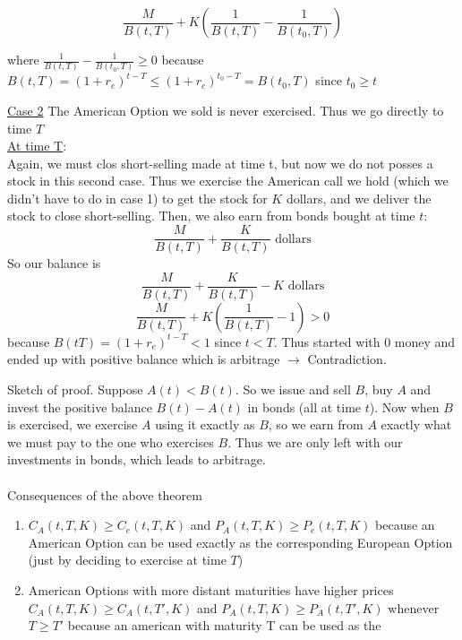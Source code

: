 \documentclass[oneside]{book}
\begin{document}
{    $$
        \frac{M}{B(t,T)} + K\left(\frac{1}{B(t,T)} - \frac{1}{B(t_0, T)}\right)

    $$

    where $\frac{1}{B(t,T)} - \frac{1}{B(t_0, T)} \geq 0$ because
        $B(t,T) = (1+r_e)^{t-T} \leq (1+r_e)^{t_0-T} = B(t_0, T)$ since $t_0 \geq t$


    \underline{Case 2} The American Option we sold is never exercised. Thus we go
    directly to time $T$ \\
    \underline{At time T}: \\
    Again, we must clos short-selling made at time t, but now we do not posses a stock in
    this second case. Thus we exercise the American call we hold (which we didn't have
    to do in case 1) to get the stock for $K$ dollars, and we deliver the stock to close
    short-selling. Then, we also earn from bonds bought at time $t$:
    $$
        \frac{M}{B(t,T)} + \frac{K}{B(t,T)} \text{ dollars}
    $$
    So our balance is
    $$
        \frac{M}{B(t,T)} + \frac{K}{B(t,T)} - K \text{ dollars}
    $$
    $$
        \frac{M}{B(t,T)} + K\left(\frac{1}{B(t,T)} - 1\right)  > 0
    $$
    because $B(t T) = (1+r_e)^{t-T} < 1$ since $t<T$. Thus started with 0 money and ended
    up with positive balance which is arbitrage $\rightarrow$ Contradiction.
}

Sketch of proof. Suppose $A(t) < B(t)$. So we issue and sell $B$, buy $A$ and invest the
positive balance $B(t) - A(t)$ in bonds (all at time $t$). Now when $B$ is exercised, we
exercise $A$ using it exactly as $B$, so we earn from $A$ exactly what we must pay to the one
who exercises $B$. Thus we are only left with our investments in bonds, which leads to
arbitrage. \\
\\
Consequences of the above theorem
\begin{enumerate}
    \item $C_A(t, T, K) \geq C_e(t, T, K)$ and $P_A(t,T,K) \geq P_e(t, T, K)$ because an
    American Option can be used exactly as the corresponding European Option (just by deciding
    to exercise at time $T$)
    \item American Options with more distant maturities have higher prices
    $C_A(t, T, K) \geq C_A(t, T', K)$ and $P_A(t,T,K) \geq P_A(t, T', K)$ whenever
    $T \geq T'$ because an american with maturity T can be used as the
\end{enumerate}
\end{document}
